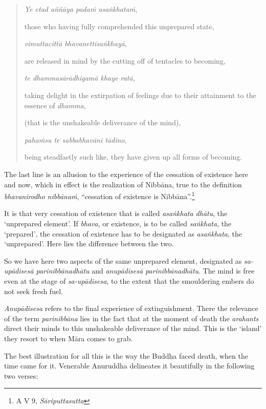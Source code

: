\begin{quote}
\emph{Ye etad aññāya padaṁ asaṅkhataṁ},

those who having fully comprehended this unprepared state,

\emph{vimuttacittā bhavanettisaṅkhayā},

are released in mind by the cutting off of tentacles to becoming,

\emph{te dhammasārādhigamā khaye ratā},

taking delight in the extirpation of feelings due to their attainment to the essence of \emph{dhamma},

(that is the unshakeable deliverance of the mind),

\emph{pahaṁsu te sabbabhavāni tādino},

being steadfastly such like, they have given up all forms of becoming.
\end{quote}

The last line is an allusion to the experience of the cessation of existence here and now, which in effect is the realization of Nibbāna, true to the definition \emph{bhavanirodho nibbānaṁ}, ``cessation of existence is Nibbāna''.\footnote{A V 9, \emph{Sāriputtasutta}}

It is that very cessation of existence that is called \emph{asaṅkhata dhātu}, the `unprepared element'. If \emph{bhava}, or existence, is to be called \emph{saṅkhata}, the `prepared', the cessation of existence has to be designated as \emph{asaṅkhata}, the `unprepared'. Here lies the difference between the two.

So we have here two aspects of the same unprepared element, designated as \emph{sa-upādisesā parinibbānadhātu} and \emph{anupādisesā parinibbānadhātu}. The mind is free even at the stage of \emph{sa-upādisesa}, to the extent that the smouldering embers do not seek fresh fuel.

\emph{Anupādisesa} refers to the final experience of extinguishment. There the relevance of the term \emph{parinibbāna} lies in the fact that at the moment of death the \emph{arahants} direct their minds to this unshakeable deliverance of the mind. This is the `island' they resort to when Māra comes to grab.

The best illustration for all this is the way the Buddha faced death, when the time came for it. Venerable Anuruddha delineates it beautifully in the following two verses:

